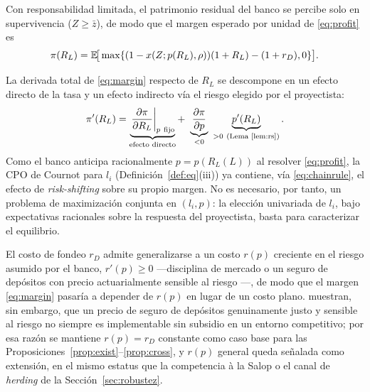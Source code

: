 Con responsabilidad limitada, el patrimonio residual del banco se percibe solo en supervivencia
($Z\ge\bar z$), de modo que el margen esperado por unidad de \eqref{eq:profit} es
\begin{equation}
\pi(R_L)=\mathbb{E}\!\big[\max\{(1-x(Z;p(R_L),\rho))(1+R_L)-(1+r_D),0\}\big].
\label{eq:margin}
\end{equation}

\begin{remark}\label{rem:chain}
La derivada total de \eqref{eq:margin} respecto de $R_L$ se descompone en un efecto directo de
la tasa y un efecto indirecto vía el riesgo elegido por el proyectista:
\begin{equation}
\pi'(R_L)=\underbrace{\left.\frac{\partial \pi}{\partial R_L}\right|_{p\ \text{fijo}}}_{\text{efecto directo}}
+\ \underbrace{\frac{\partial \pi}{\partial p}}_{<0}\ \underbrace{p'(R_L)}_{>0\ (\text{Lema~\ref{lem:rs}})}.
\label{eq:chainrule}
\end{equation}
Como el banco anticipa racionalmente $p=p(R_L(L))$ al resolver \eqref{eq:profit}, la CPO de
Cournot para $l_i$ (Definición~\ref{def:eq}(iii)) ya contiene, vía \eqref{eq:chainrule}, el
efecto de \textit{risk-shifting} sobre su propio margen. No es necesario, por tanto, un problema
de maximización conjunta en $(l_i,p)$: la elección univariada de $l_i$, bajo expectativas
racionales sobre la respuesta del proyectista, basta para caracterizar el equilibrio.
\end{remark}

\begin{remark}\label{rem:riskfunding}
El costo de fondeo $r_D$ admite generalizarse a un costo $r(p)$ creciente en el riesgo asumido
por el banco, $r'(p)\ge 0$ —disciplina de mercado o un seguro de depósitos con precio
actuarialmente sensible al riesgo \citep{Merton1977}—, de modo que el margen \eqref{eq:margin}
pasaría a depender de $r(p)$ en lugar de un costo plano. \citet{ChanGreenbaumThakor1992}
muestran, sin embargo, que un precio de seguro de depósitos genuinamente justo y sensible al
riesgo no siempre es implementable sin subsidio en un entorno competitivo; por esa razón se
mantiene $r(p)=r_D$ constante como caso base para las Proposiciones~\ref{prop:exist}--\ref{prop:cross},
y $r(p)$ general queda señalada como extensión, en el mismo estatus que la competencia à la
Salop o el canal de \textit{herding} de la Sección~\ref{sec:robustez}.
\end{remark}


